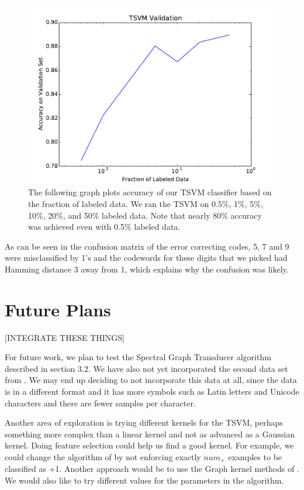 \documentclass[11pt]{article}
\begin{document}
\begin{figure}
  \centering
  \caption{The following graph plots accuracy of our TSVM classifier based on the fraction of labeled data. We ran the TSVM on 0.5\%, 1\%, 5\%, 10\%, 20\%, and 50\% labeled data. Note that nearly 80\% accuracy was achieved even with 0.5\% labeled data.}
  \includegraphics[width=5in]{tsvm.pdf}
\end{figure}


As can be seen in the confusion matrix of the error correcting codes,
5, 7 and 9 were misclassified by 1's and the codewords for
these digits that we picked had Hamming distance 3 away from 1, which
explains why the confusion was likely.

\section{Future Plans}

[INTEGRATE THESE THINGS]

For future work, we plan to test the Spectral Graph Transducer algorithm described in section 3.2. We have also not yet incorporated the second data set from \cite{Llorens:2008}. We may end up deciding to not incorporate this data at all, since the data is in a different format and it has more symbols such as Latin letters and Unicode characters and there are fewer samples per character.

Another area of exploration is trying different kernels for the TSVM, perhaps something more complex than a linear kernel and not as advanced as a Gaussian kernel. Doing feature selection could help us find a good kernel. For example, we could change the algorithm of \cite{Joachims:1999} by not enforcing exactly $num_+$ examples to be classified as +1. Another approach would be to use the Graph kernel methods of \cite{smola2003kernels}. We would also like to try different values for the parameters in the algorithm.
\end{document}
